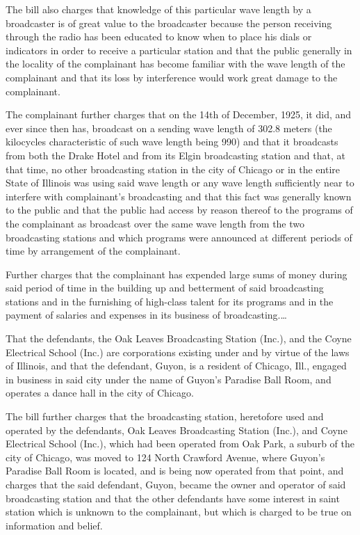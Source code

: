 The bill also charges that knowledge of this particular wave length by a
broadcaster is of great value to the broadcaster because the person receiving
through the radio has been educated to know when to place his dials or
indicators in order to receive a particular station and that the public
generally in the locality of the complainant has become familiar with the wave
length of the complainant and that its loss by interference would work great
damage to the complainant.

The complainant further charges that on the 14th of
December, 1925, it did, and ever since then has, broadcast on a sending wave
length of 302.8 meters (the kilocycles characteristic of such wave length being
990) and that it broadcasts from both the Drake Hotel and from its Elgin
broadcasting station and that, at that time, no other broadcasting station in
the city of Chicago or in the entire State of Illinois was using said wave
length or any wave length sufficiently near to interfere with complainant's
broadcasting and that this fact was generally known to the public and that the
public had access by reason thereof to the programs of the complainant as
broadcast over the same wave length from the two broadcasting stations and
which programs were announced at different periods of time by arrangement of
the complainant.

Further charges that the complainant has expended large sums of money during
said period of time in the building up and betterment of said broadcasting
stations and in the furnishing of high-class talent for its programs and in the
payment of salaries and expenses in its business of broadcasting.\dots

That the defendants, the Oak Leaves Broadcasting Station (Inc.), and the Coyne
Electrical School (Inc.) are corporations existing under and by virtue of the
laws of Illinois, and that the defendant, Guyon, is a resident of Chicago,
Ill., engaged in business in said city under the name of Guyon's Paradise Ball
Room, and operates a dance hall in the city of Chicago.

The bill further charges that the broadcasting station, heretofore used and
operated by the defendants, Oak Leaves Broadcasting Station (Inc.), and Coyne
Electrical School (Inc.), which had been operated from Oak Park, a suburb of
the city of Chicago, was moved to 124 North Crawford Avenue, where Guyon's
Paradise Ball Room is located, and is being now operated from that point, and
charges that the said defendant, Guyon, became the owner and operator of said
broadcasting station and that the other defendants have some interest in saint
station which is unknown to the complainant, but which is charged to be true on
information and belief.

